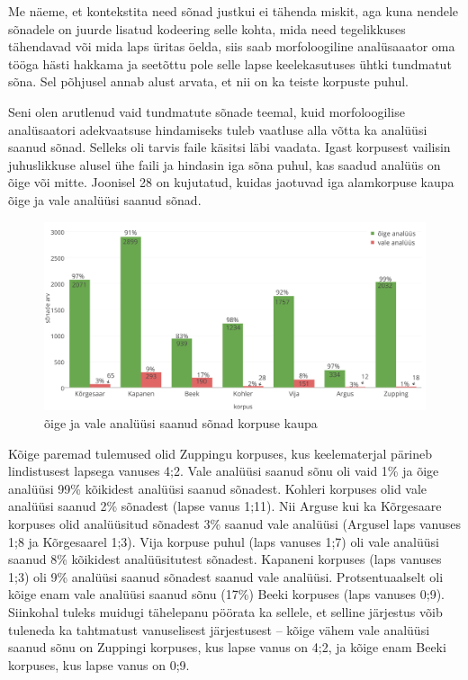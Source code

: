 \documentclass[12pt]{article}
\begin{document}
Me näeme, et kontekstita need sõnad justkui ei tähenda miskit, aga kuna nendele sõnadele on juurde lisatud kodeering selle kohta, mida need tegelikkuses tähendavad või mida laps üritas öelda, siis saab morfoloogiline analüsaaator oma tööga hästi hakkama ja seetõttu pole selle lapse keelekasutuses ühtki tundmatut sõna. Sel põhjusel annab alust arvata, et nii on ka teiste korpuste puhul.

Seni olen arutlenud vaid tundmatute sõnade teemal, kuid morfoloogilise analüsaatori adekvaatsuse hindamiseks tuleb vaatluse alla võtta ka analüüsi saanud sõnad. Selleks oli tarvis faile käsitsi läbi vaadata. Igast korpusest vailisin juhuslikkuse alusel ühe faili ja hindasin iga sõna puhul, kas saadud analüüs on õige või mitte. Joonisel 28 on kujutatud, kuidas jaotuvad iga alamkorpuse kaupa õige ja vale analüüsi saanud sõnad.
\hfill


\begin{figure}[H]
    \centering
    \includegraphics[width=\textwidth]{kasitsi_valed_oiged_crop}
    \caption{õige ja vale analüüsi saanud sõnad korpuse kaupa}
\end{figure}

Kõige paremad tulemused olid Zuppingu korpuses, kus keelematerjal pärineb lindistusest lapsega vanuses 4;2. Vale analüüsi saanud sõnu oli vaid 1\% ja õige analüüsi 99\% kõikidest analüüsi saanud sõnadest. Kohleri korpuses olid vale analüüsi saanud 2\% sõnadest (lapse vanus 1;11). Nii Arguse kui ka Kõrgesaare korpuses olid analüüsitud sõnadest 3\% saanud vale analüüsi (Argusel laps vanuses 1;8 ja Kõrgesaarel 1;3). Vija korpuse puhul (laps vanuses 1;7) oli vale analüüsi saanud 8\% kõikidest analüüsitutest sõnadest. Kapaneni korpuses (laps vanuses 1;3) oli 9\% analüüsi saanud sõnadest saanud vale analüüsi. Protsentuaalselt oli kõige enam vale analüüsi saanud sõnu (17\%) Beeki korpuses (laps vanuses 0;9). Siinkohal tuleks muidugi tähelepanu pöörata ka sellele, et selline järjestus võib tuleneda ka tahtmatust vanuselisest järjestusest -- kõige vähem vale analüüsi saanud sõnu on Zuppingi korpuses, kus lapse vanus on 4;2, ja kõige enam Beeki korpuses, kus lapse vanus on 0;9.
\end{document}
